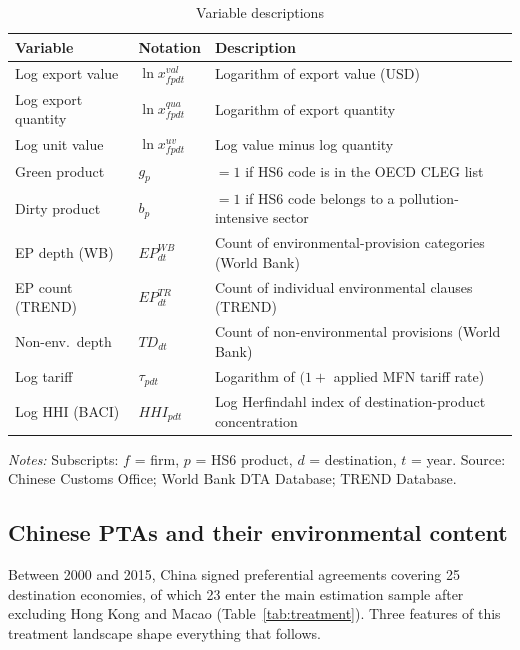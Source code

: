 \documentclass[12pt]{article}
\begin{document}
\begin{table}[htbp]
\centering
\caption{Variable descriptions}
\label{tab:vardesc}
\small
\begin{threeparttable}
\begin{tabular}{lll}
\toprule
Variable & Notation & Description \\
\midrule
Log export value & $\ln x^{val}_{fpdt}$ & Logarithm of export value (USD) \\
Log export quantity & $\ln x^{qua}_{fpdt}$ & Logarithm of export quantity \\
Log unit value & $\ln x^{uv}_{fpdt}$ & Log value minus log quantity \\
Green product & $g_p$ & $=1$ if HS6 code is in the OECD CLEG list \\
Dirty product & $b_p$ & $=1$ if HS6 code belongs to a pollution-intensive sector \\
EP depth (WB) & $EP^{WB}_{dt}$ & Count of environmental-provision categories (World Bank) \\
EP count (TREND) & $EP^{TR}_{dt}$ & Count of individual environmental clauses (TREND) \\
Non-env.\ depth & $TD_{dt}$ & Count of non-environmental provisions (World Bank) \\
Log tariff & $\tau_{pdt}$ & Logarithm of $(1 +$ applied MFN tariff rate) \\
Log HHI (BACI) & $HHI_{pdt}$ & Log Herfindahl index of destination-product concentration \\
\bottomrule
\end{tabular}
\begin{tablenotes}\footnotesize
\item \emph{Notes:} Subscripts: $f$ = firm, $p$ = HS6 product, $d$ = destination, $t$ = year. Source: Chinese Customs Office; World Bank DTA Database; TREND Database.
\end{tablenotes}
\end{threeparttable}
\end{table}

\subsection{Chinese PTAs and their environmental content}

Between 2000 and 2015, China signed preferential agreements covering 25 destination
economies, of which 23 enter the main estimation sample after excluding Hong Kong and
Macao (Table~\ref{tab:treatment}). Three features of this treatment landscape
shape everything that follows.
\end{document}
